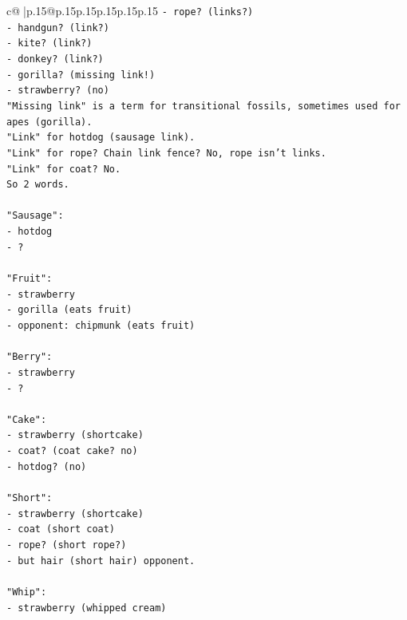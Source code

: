 \documentclass{article}
\begin{document}
{\begin{supertabular}{c@{$\;$}|p{.15\linewidth}@{}p{.15\linewidth}p{.15\linewidth}p{.15\linewidth}p{.15\linewidth}p{.15\linewidth}}
{{{\texttt{{-} rope? (links?)} \\
\texttt{{-} handgun? (link?)} \\
\texttt{{-} kite? (link?)} \\
\texttt{{-} donkey? (link?)} \\
\texttt{{-} gorilla? (missing link!)} \\
\texttt{{-} strawberry? (no)} \\
\texttt{"Missing link" is a term for transitional fossils, sometimes used for apes (gorilla).} \\
\texttt{"Link" for hotdog (sausage link).} \\
\texttt{"Link" for rope? Chain link fence? No, rope isn't links.} \\
\texttt{"Link" for coat? No.} \\
\texttt{So 2 words.} \\
\\ 
\texttt{"Sausage":} \\
\texttt{{-} hotdog} \\
\texttt{{-} ?} \\
\\ 
\texttt{"Fruit":} \\
\texttt{{-} strawberry} \\
\texttt{{-} gorilla (eats fruit)} \\
\texttt{{-} opponent: chipmunk (eats fruit)} \\
\\ 
\texttt{"Berry":} \\
\texttt{{-} strawberry} \\
\texttt{{-} ?} \\
\\ 
\texttt{"Cake":} \\
\texttt{{-} strawberry (shortcake)} \\
\texttt{{-} coat? (coat cake? no)} \\
\texttt{{-} hotdog? (no)} \\
\\ 
\texttt{"Short":} \\
\texttt{{-} strawberry (shortcake)} \\
\texttt{{-} coat (short coat)} \\
\texttt{{-} rope? (short rope?)} \\
\texttt{{-} but hair (short hair) opponent.} \\
\\ 
\texttt{"Whip":} \\
\texttt{{-} strawberry (whipped cream)} \\
}}}
\end{supertabular}}
\end{document}
